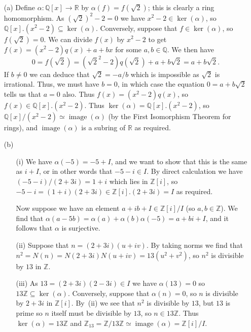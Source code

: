 \documentclass{amsart}
\newcommand{\img}       {\operatorname{image}}
\newcommand{\Q}         {{\mathbb{Q}}}
\newcommand{\R}         {{\mathbb{R}}}
\newcommand{\Z}         {{\mathbb{Z}}}
\newcommand{\al}        {\alpha}
\newcommand{\sse}       {\subseteq}
\newcommand{\xra}       {\xrightarrow}
\renewcommand{\:}{\colon}
\theoremstyle{definition}
\renewenvironment{solution}{\SolutionAtEnd}{\endSolutionAtEnd}
\begin{document}
\begin{solution}
 \begin{itemize}
  \item[(a)] Define $\al\:\Q[x]\xra{}\R$ by $\al(f)=f(\sqrt{2})$; this
   is clearly a ring homomorphism.  As $(\sqrt{2})^2-2=0$ we have
   $x^2-2\in\ker(\al)$, so $\Q[x].(x^2-2)\sse\ker(\al)$.  Conversely,
   suppose that $f\in\ker(\al)$, so $f(\sqrt{2})=0$.  We can divide
   $f(x)$ by $x^2-2$ to get $f(x)=(x^2-2)q(x)+a+bx$ for some
   $a,b\in\Q$.  We then have
   \[ 0=f(\sqrt{2})=(\sqrt{2}^2-2)q(\sqrt{2})+a+b\sqrt{2}=a+b\sqrt{2}. \]
   If $b\neq 0$ we can deduce that $\sqrt{2}=-a/b$ which is impossible
   as $\sqrt{2}$ is irrational.  Thus, we must have $b=0$, in which
   case the equation $0=a+b\sqrt{2}$ tells us that $a=0$ also.  Thus
   $f(x)=(x^2-2)q(x)$, so $f(x)\in\Q[x].(x^2-2)$.  Thus
   $\ker(\al)=\Q[x].(x^2-2)$, so $\Q[x]/(x^2-2)\simeq\img(\al)$ (by
   the First Isomorphism Theorem for rings), and $\img(\al)$ is a
   subring of $\R$ as required.
  \item[(b)] 
   \begin{itemize}
    \item[(i)] We have $\al(-5)=-5+I$, and we want to show that this
     is the same as $i+I$, or in other words that $-5-i\in I$.  By
     direct calculation we have $(-5-i)/(2+3i)=1+i$ which lies in
     $\Z[i]$, so $-5-i=(1+i)(2+3i)\in \Z[i].(2+3i)=I$ as required.

     Now suppose we have an element $a+ib+I\in\Z[i]/I$ (so
     $a,b\in\Z$).  We find that
     $\al(a-5b)=\al(a)+\al(b)\al(-5)=a+bi+I$, and it follows that
     $\al$ is surjective.
    \item[(ii)] Suppose that $n=(2+3i)(u+iv)$.  By taking norms we
     find that $n^2=N(n)=N(2+3i)N(u+iv)=13(u^2+v^2)$, so $n^2$ is
     divisible by $13$ in $\Z$.
    \item[(iii)] As $13=(2+3i)(2-3i)\in I$ we have $\al(13)=0$ so
     $13\Z\sse\ker(\al)$.  Conversely, suppose that $\al(n)=0$, so $n$
     is divisible by $2+3i$ in $\Z[i]$.  By~(ii) we see that $n^2$ is
     divisible by $13$, but $13$ is prime so $n$ itself must be
     divisible by $13$, so $n\in 13\Z$.  Thus $\ker(\al)=13\Z$ and
     $\Z_{13}=\Z/13\Z\simeq\img(\al)=\Z[i]/I$.
   \end{itemize}
 \end{itemize}
\end{solution}
\end{document}
